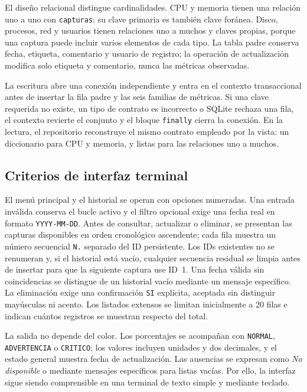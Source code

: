\documentclass[conference]{IEEEtran}
\begin{document}
El dise\~no relacional distingue cardinalidades. CPU y memoria tienen una relaci\'on uno a uno con \texttt{capturas}: su clave primaria es tambi\'en clave for\'anea. Disco, procesos, red y usuarios tienen relaciones uno a muchos y claves propias, porque una captura puede incluir varios elementos de cada tipo. La tabla padre conserva fecha, etiqueta, comentario y usuario de registro; la operaci\'on de actualizaci\'on modifica solo etiqueta y comentario, nunca las m\'etricas observadas.

La escritura abre una conexi\'on independiente y entra en el contexto transaccional antes de insertar la fila padre y las seis familias de m\'etricas. Si una clave requerida no existe, un tipo de contrato es incorrecto o SQLite rechaza una fila, el contexto revierte el conjunto y el bloque \texttt{finally} cierra la conexi\'on. En la lectura, el repositorio reconstruye el mismo contrato empleado por la vista: un diccionario para CPU y memoria, y listas para las relaciones uno a muchos.

\subsection{Criterios de interfaz terminal}
El men\'u principal y el historial se operan con opciones numeradas. Una entrada inv\'alida conserva el bucle activo y el filtro opcional exige una fecha real en formato \texttt{YYYY-MM-DD}. Antes de consultar, actualizar o eliminar, se presentan las capturas disponibles en orden cronol\'ogico ascendente; cada fila muestra un n\'umero secuencial \texttt{N.} separado del ID persistente. Los IDs existentes no se renumeran y, si el historial est\'a vac\'io, cualquier secuencia residual se limpia antes de insertar para que la siguiente captura use ID~1. Una fecha v\'alida sin coincidencias se distingue de un historial vac\'io mediante un mensaje espec\'ifico. La eliminaci\'on exige una confirmaci\'on \texttt{SI} expl\'icita, aceptada sin distinguir may\'usculas ni acento. Los listados extensos se limitan inicialmente a 20 filas e indican cu\'antos registros se muestran respecto del total.

La salida no depende del color. Los porcentajes se acompa\~nan con \texttt{NORMAL}, \texttt{ADVERTENCIA} o \texttt{CRITICO}; los valores incluyen unidades y dos decimales, y el estado general muestra fecha de actualizaci\'on. Las ausencias se expresan como \emph{No disponible} o mediante mensajes espec\'ificos para listas vac\'ias. Por ello, la interfaz sigue siendo comprensible en una terminal de texto simple y mediante teclado.
\end{document}
